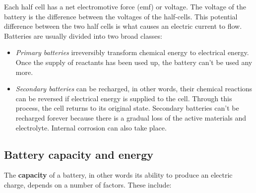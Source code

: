 Each half cell has a net electromotive force (emf) or voltage. The voltage of the battery is the difference between the voltages of the half-cells. This potential difference between the two half cells is what causes an electric current to flow. \\

Batteries are usually divided into two broad classes:

\begin{itemize}
\item{\textit{Primary batteries} irreversibly transform chemical energy to electrical energy. Once the supply of reactants has been used up, the battery can't be used any more.}
 
\item{\textit{Secondary batteries} can be recharged, in other words, their chemical reactions can be reversed if electrical energy is supplied to the cell. Through this process, the cell returns to its original state. Secondary batteries can't be recharged forever because there is a gradual loss of the active materials and electrolyte. Internal corrosion can also take place.}
\end{itemize}

\subsection{Battery capacity and energy}

The \textbf{capacity} of a battery, in other words its ability to produce an electric charge, depends on a number of factors. These include:

